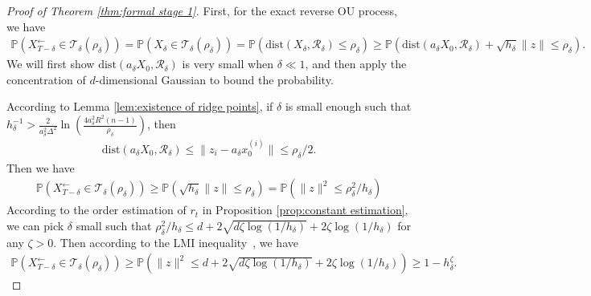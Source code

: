 \documentclass[11pt]{article}
\newcommand{\mb}{\mathbb}
\newcommand{\mc}{\mathcal}
\begin{document}
\begin{proof}[Proof of Theorem \ref{thm:formal stage 1}] First, for the exact reverse OU process, we have
    \begin{align*}
    \mb{P}(X_{T-\delta}^\leftarrow\in \mc{T}_\delta(\rho_\delta)) = \mb{P}(X_\delta\in \mc{T}_\delta(\rho_\delta)) = \mb{P}(\mathrm{dist}(X_\delta,\mc{R}_\delta)\le \rho_\delta)\ge \mb{P}( \mathrm{dist}(a_\delta X_0,\mc{R}_\delta) + \sqrt{h_\delta}\|z\|\le \rho_\delta ).
\end{align*}
We will first show $\mathrm{dist}(a_\delta X_0,\mc{R}_\delta)$ is very small when $\delta\ll 1$, and then apply the concentration of $d$-dimensional Gaussian to bound the probability.

According to Lemma \ref{lem:existence of ridge points}, if $\delta$ is small enough such that $h_\delta^{-1}> \tfrac{2}{a_\delta^2 \Delta^2}\ln(\tfrac{4a_\delta^2R^2(n-1)}{\rho_\delta})$, then 
\begin{align*}
    \mathrm{dist}(a_\delta X_0,\mc{R}_\delta) \le \| z_i - a_\delta x_0^{(i)} \| \le \rho_\delta/2.
\end{align*} 
Then we have 
\begin{align*}
     \mb{P}(X_{T-\delta}^\leftarrow\in \mc{T}_\delta(\rho_\delta)) \ge \mb{P}(\sqrt{h_\delta}\|z\|\le \rho_\delta) = \mb{P}(\|z\|^2\le \rho_\delta^2/h_\delta)
\end{align*}
According to the order estimation of $r_t$ in Proposition \ref{prop:constant estimation}, we can pick $\delta$ small such that $\rho_\delta^2/h_\delta\le d+2\sqrt{d \zeta \log (1/h_\delta)}+2\zeta\log(1/h_\delta)$ for any $\zeta>0$. Then according to the LMI inequality~\citep{moshksar2024refining}, we have
\begin{align*}
    \mb{P}(X_{T-\delta}^\leftarrow\in \mc{T}_\delta(\rho_\delta)) \ge \mb{P}(\|z\|^2\le d+2\sqrt{d \zeta \log (1/h_\delta)}+2\zeta\log(1/h_\delta))\ge 1- h_\delta^\zeta.
\end{align*}


\end{proof}
\end{document}

